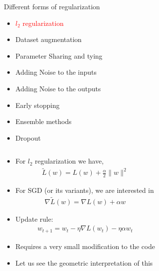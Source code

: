 \begin{frame}
\end{frame}

\begin{frame}
	\vspace{4em}
	\begin{overlayarea}{\textwidth}{\textheight}
		\begin{block}{Different forms of regularization}
			\begin{itemize}
				\item \textcolor{red}{$l_2$ regularization}
				\item Dataset augmentation
				\item Parameter Sharing and tying
				\item Adding Noise to the inputs 
				\item Adding Noise to the outputs
				\item Early stopping
				\item Ensemble methods
				\item Dropout
			\end{itemize}
		\end{block}
	\end{overlayarea}
\end{frame}

	
\begin{frame}
	\begin{columns}
		\column{\textwidth}
		\vspace{2em}
		\begin{overlayarea}{\textwidth}{\textheight}
			\begin{itemize}
				\item<1-> For $l_2$ regularization we have,
				\begin{align*} 
					\widetilde{L}(w) = L(w) + \frac{\alpha}{2} \|w\|^2
				\end{align*}
				\item<2-> For SGD (or its variants), we are interested in
				\begin{align*}
					\nabla \widetilde{L}(w) =  \nabla L(w) + \alpha w
				\end{align*}
				\item<3-> Update rule:
				\begin{align*}
				w_{t+1} = w_t - \eta \nabla L(w_t) - \eta \alpha w_t
				\end{align*}
				\item<4-> Requires a very small modification to the code
									
				\item<5-> Let us see the geometric interpretation of this
			\end{itemize}
		\end{overlayarea}
	\end{columns}
\end{frame}
	
